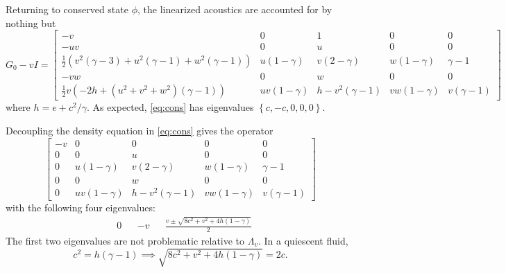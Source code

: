 \documentclass[letterpaper,11pt,nointlimits,reqno]{amsart}
\begin{document}
Returning to conserved state $\phi$, the linearized acoustics are accounted for
by nothing but
\begin{equation}\label{eq:cons}
  G_0 - vI =
\begin{bmatrix}
 -v & 0 & 1 & 0 & 0 \\
 -u v & 0 & u & 0 & 0 \\
 \frac{1}{2} \left(v^2 (\gamma-3)+u^2 (\gamma-1)+w^2 (\gamma-1 )\right) & u(1-\gamma) & v (2-\gamma ) & w(1-\gamma) & \gamma-1  \\
 -v w & 0 & w & 0 & 0 \\
 \frac{1}{2} v \left(-2 h+\left(u^2+v^2+w^2\right) (\gamma-1 )\right) & u v (1-\gamma ) & h-v^2 (\gamma-1 ) & v w (1-\gamma ) & v (\gamma-1)
\end{bmatrix}
\end{equation}
where $h=e + c^2 / \gamma$.
As expected, \eqref{eq:cons} has eigenvalues $\left\{c, -c, 0, 0, 0\right\}$.

Decoupling the density equation in \eqref{eq:cons} gives the operator
\begin{equation}
\begin{bmatrix}
 -v & 0 & 0 & 0 & 0 \\
 0 & 0 & u & 0 & 0 \\
 0 & u(1-\gamma) & v (2-\gamma ) & w(1-\gamma) & \gamma-1  \\
 0 & 0 & w & 0 & 0 \\
 0 & u v (1-\gamma ) & h-v^2 (\gamma-1 ) & v w (1-\gamma ) & v (\gamma-1)
\end{bmatrix}
\end{equation}
with the following four eigenvalues:
\begin{align}
 &0
&
 &-v
&
&\frac{v \pm \sqrt{8 c^2+v^2+4 h (1-\gamma)}}{2}
\end{align}
The first two eigenvalues are not problematic relative to $\Lambda_v$.
In a quiescent fluid, 
\begin{equation}
 c^2=h(\gamma-1) \implies
\sqrt{8 c^2+v^2+4 h (1-\gamma)} = 2c
.
\end{equation}
\end{document}
